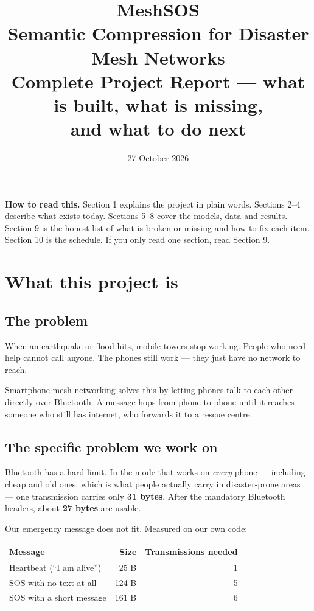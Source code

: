 \documentclass[11pt,a4paper]{article}
\title{\textbf{MeshSOS}\\[4pt]
\large Semantic Compression for Disaster Mesh Networks\\[10pt]
\normalsize Complete Project Report --- what is built, what is missing,\\
and what to do next}
\author{}
\date{27 October 2026}
\begin{document}
\maketitle
\thispagestyle{fancy}

\begin{tcolorbox}[colback=soft,colframe=ink!30,boxrule=0.5pt]
\textbf{How to read this.} Section 1 explains the project in plain words.
Sections 2--4 describe what exists today. Sections 5--8 cover the models,
data and results. Section 9 is the honest list of what is broken or missing
and how to fix each item. Section 10 is the schedule. If you only read one
section, read Section 9.
\end{tcolorbox}

\tableofcontents
\newpage

\section{What this project is}

\subsection{The problem}

When an earthquake or flood hits, mobile towers stop working. People who need
help cannot call anyone. The phones still work --- they just have no network
to reach.

Smartphone mesh networking solves this by letting phones talk to each other
directly over Bluetooth. A message hops from phone to phone until it reaches
someone who still has internet, who forwards it to a rescue centre.

\subsection{The specific problem we work on}

Bluetooth has a hard limit. In the mode that works on \emph{every} phone ---
including cheap and old ones, which is what people actually carry in
disaster-prone areas --- one transmission carries only \textbf{31 bytes}.
After the mandatory Bluetooth headers, about \textbf{27 bytes} are usable.

Our emergency message does not fit. Measured on our own code:

\begin{center}
\begin{tabular}{lrr}
\toprule
\textbf{Message} & \textbf{Size} & \textbf{Transmissions needed} \\
\midrule
Heartbeat (``I am alive'') & 25 B & 1 \\
SOS with no text at all & 124 B & 5 \\
SOS with a short message & 161 B & 6 \\
\bottomrule
\end{tabular}
\end{center}
\end{document}
